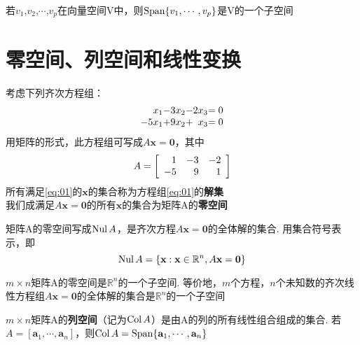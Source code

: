 \begin{TheoremOne}
若$v_1$,$v_2$,$\cdots$,$v_p$在向量空间V中，则$\operatorname{Span}\{v_1,\cdots,v_p\}$是V的一个子空间
\end{TheoremOne}

\section{零空间、列空间和线性变换}
考虑下列齐次方程组：
\begin{equation}
\begin{array}{r@{\hspace{0pt}}l@{\hspace{0pt}}r@{\hspace{0pt}}l@{\hspace{0pt}}r@{\hspace{0pt}}l}
x_1 & - & 3x_2 & - & 2x_3 & =0\\
-5x_1 & + & 9x_2 & + & x_3 & =0
\end{array}\label{eq:01}
\end{equation}
用矩阵的形式，此方程组可写成$A\mathbf{x=0}$，其中
\[A=\left[\begin{array}{r r r}
1 & -3 & -2\\
-5 & 9 & 1
\end{array}\right]\]
所有满足\eqref{eq:01}的$\mathbf{x}$的集合称为方程组\eqref{eq:01}的\textbf{解集}\\
我们成满足$A\mathbf{x=0}$的所有$\mathbf{x}$的集合为矩阵A的\textbf{零空间}\\[2ex]

\begin{definition}
矩阵A的零空间写成$\operatorname{Nul} A$，是齐次方程$A\mathbf{x=0}$的全体解的集合. 用集合符号表示，即
\[\operatorname{Nul} A=\{\mathbf{x}:\mathbf{x}\in\mathbb{R}^n, A\mathbf{x=0}\}\]
\end{definition}\vspace{4ex}

\begin{TheoremOne}
$m\times n$矩阵A的零空间是$\mathbb{R}^n$的一个子空间. 等价地，$m$个方程，$n$个未知数的齐次线性方程组$A\mathbf{x=0}$的全体解的集合是$\mathbb{R}^n$的一个子空间
\end{TheoremOne}\vspace{4ex}

\begin{definition}
$m\times n$矩阵A的\textbf{列空间}（记为$\operatorname{Col} A$）是由A的列的所有线性组合组成的集合. 若$A=[\mathbf{a}_1,\cdots,\mathbf{a}_n]$，则$\operatorname{Col} A=\operatorname{Span}\{\mathbf{a}_1,\cdots,\mathbf{a}_n\}$
\end{definition}\vspace{4ex}


